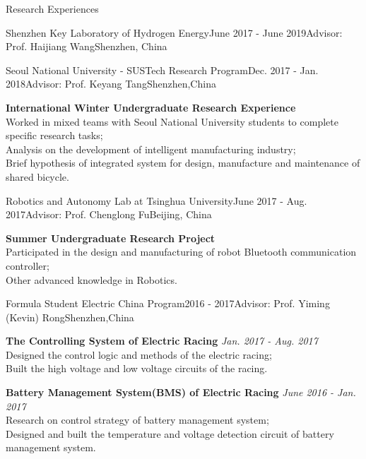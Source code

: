 \documentclass{resume} %
\begin{document}
\begin{rSection}{Research Experiences}
\begin{rSubsection}{Shenzhen Key Laboratory of Hydrogen Energy}{June 2017 - June 2019}{Advisor: Prof. Haijiang Wang}{Shenzhen, China}
    \end{rSubsection}

    \begin{rSubsection}{Seoul National University - SUSTech Research Program}{Dec. 2017 - Jan. 2018}{Advisor: Prof. Keyang Tang}{Shenzhen,China}
        \vspace{-4pt}
        \item \textbf{International Winter Undergraduate Research Experience} \\
        Worked in mixed teams with Seoul National University students to complete specific research tasks;\\ 
        Analysis on the development of intelligent manufacturing industry; \\
        Brief hypothesis of integrated system for design, manufacture and maintenance of shared bicycle.
    \end{rSubsection}

    \begin{rSubsection}{Robotics and Autonomy Lab at Tsinghua University}{June 2017 - Aug. 2017}{Advisor: Prof. Chenglong Fu}{Beijing, China}
        \vspace{-4pt}
        \item \textbf{Summer Undergraduate Research Project} \\
        Participated in the design and manufacturing of robot Bluetooth communication controller; \\
        Other advanced knowledge in Robotics.
    \end{rSubsection}

    \begin{rSubsection}{Formula Student Electric China Program}{2016 - 2017}{Advisor: Prof. Yiming (Kevin) Rong}{Shenzhen,China}
        \vspace{-4pt}
        \item \textbf{The Controlling System of Electric Racing}  \hfill {\em Jan. 2017 - Aug. 2017}\\
        Designed the control logic and methods of the electric racing;\\
        Built the high voltage and low voltage circuits of the racing.
        \item \textbf{Battery Management System(BMS) of Electric Racing}  \hfill {\em June 2016 - Jan. 2017}\\
        Research on control strategy of battery management system; \\
        Designed and built the temperature and voltage detection circuit of battery management system.

    \end{rSubsection}
 
\end{rSection}
\end{document}

